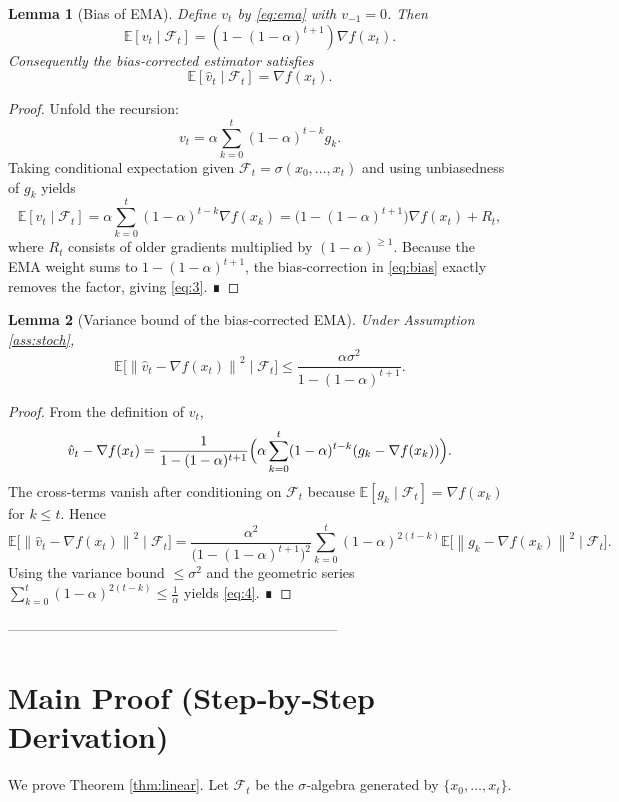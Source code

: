 \documentclass{article}
\newtheorem{lemma}{Lemma}
\newcommand{\EE}{\mathbb{E}}
\newcommand{\norm}[1]{\left\lVert #1\right\rVert}
\newcommand{\grad}{\nabla}
\begin{document}
\begin{lemma}[Bias of EMA]\label{lem:bias}
Define $v_{t}$ by \eqref{eq:ema} with $v_{-1}=0$. Then
\[
    \EE[v_{t}\mid \mathcal{F}_{t}]= (1-(1-\alpha)^{t+1})\grad f(x_{t}) .
\]
Consequently the bias‑corrected estimator satisfies
\[
    \EE[\hat v_{t}\mid \mathcal{F}_{t}]=\grad f(x_{t}).
\tag{3}
\]
\end{lemma}
\begin{proof}
Unfold the recursion:
\[
    v_{t}= \alpha\sum_{k=0}^{t}(1-\alpha)^{t-k}g_{k}.
\]
Taking conditional expectation given $\mathcal{F}_{t}=\sigma(x_{0},\dots ,x_{t})$ and using unbiasedness of $g_{k}$ yields
\[
    \EE[v_{t}\mid \mathcal{F}_{t}]
    =\alpha\sum_{k=0}^{t}(1-\alpha)^{t-k}\grad f(x_{k})
    =\bigl(1-(1-\alpha)^{t+1}\bigr)\grad f(x_{t})+R_{t},
\]
where $R_{t}$ consists of older gradients multiplied by $(1-\alpha)^{\ge 1}$. Because the EMA weight sums to $1-(1-\alpha)^{t+1}$, the bias‑correction in \eqref{eq:bias} exactly removes the factor, giving \eqref{eq:3}. ∎
\end{proof}

\begin{lemma}[Variance bound of the bias‑corrected EMA]\label{lem:var}
Under Assumption \ref{ass:stoch},
\[
    \EE\!\bigl[\norm{\hat v_{t}-\grad f(x_{t})}^{2}\mid \mathcal{F}_{t}\bigr]\le \frac{\alpha\sigma^{2}}{1-(1-\alpha)^{t+1}}.
\tag{4}
\]
\end{lemma}
\begin{proof}
From the definition of $v_{t}$,
\[
    \hat v_{t}-\grad f(x_{t})
    =\frac{1}{1-(1-\alpha)^{t+1}}\Bigl(\alpha\sum_{k=0}^{t}(1-\alpha)^{t-k}(g_{k}-\grad f(x_{k}))\Bigr).
\]
The cross‑terms vanish after conditioning on $\mathcal{F}_{t}$ because $\EE[g_{k}\mid \mathcal{F}_{t}]=\grad f(x_{k})$ for $k\le t$. Hence
\[
    \EE\!\bigl[\norm{\hat v_{t}-\grad f(x_{t})}^{2}\mid \mathcal{F}_{t}\bigr]
    =\frac{\alpha^{2}}{\bigl(1-(1-\alpha)^{t+1}\bigr)^{2}}
      \sum_{k=0}^{t}(1-\alpha)^{2(t-k)}\EE\!\bigl[\norm{g_{k}-\grad f(x_{k})}^{2}\mid \mathcal{F}_{t}\bigr].
\]
Using the variance bound $\le\sigma^{2}$ and the geometric series $\sum_{k=0}^{t}(1-\alpha)^{2(t-k)}\le \frac{1}{\alpha}$ yields \eqref{eq:4}. ∎
\end{proof}

-----------------------------------------------------------------------

\section*{Main Proof (Step‑by‑Step Derivation)}
We prove Theorem \ref{thm:linear}. Let $\mathcal{F}_{t}$ be the $\sigma$‑algebra generated by $\{x_{0},\dots ,x_{t}\}$.
\end{document}
